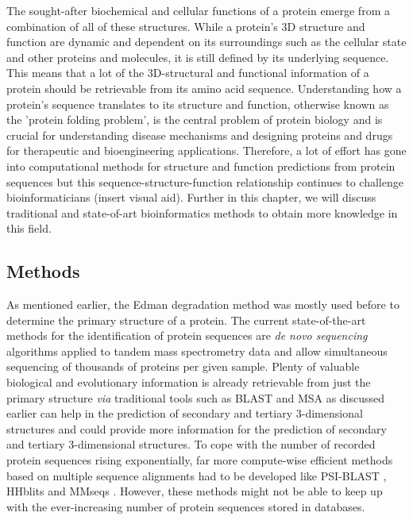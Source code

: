 The sought-after biochemical and cellular functions of a protein emerge from a combination of all of these structures. While a protein's 3D structure and function are dynamic and dependent on its surroundings such as the cellular state and other proteins and molecules, it is still defined by its underlying sequence. This means that a lot of the 3D-structural and functional information of a protein should be retrievable from its amino acid sequence\cite{structure}. Understanding how a protein's sequence translates to its structure and function, otherwise known as the 'protein folding problem', is the central problem of protein biology and is crucial for understanding disease mechanisms and designing proteins and drugs for therapeutic and bioengineering applications. Therefore, a lot of effort has gone into computational methods for structure and function predictions from protein sequences but this sequence-structure-function relationship continues to challenge bioinformaticians (insert visual aid). Further in this chapter, we will discuss traditional and state-of-art bioinformatics methods to obtain more knowledge in this field.

\subsection{Methods}
As mentioned earlier, the Edman degradation method was mostly used before to determine the primary structure of a protein. The current state-of-the-art methods for the identification of protein sequences are \textit{de novo sequencing} algorithms applied to tandem mass spectrometry data\cite{protseq} and allow simultaneous sequencing of thousands of proteins per given sample. Plenty of valuable biological and evolutionary information is already retrievable from just the primary structure \textit{via} traditional tools such as BLAST and MSA as discussed earlier can help in the prediction of secondary and tertiary 3-dimensional structures and could provide more information for the prediction of secondary and tertiary 3-dimensional structures. To cope with the number of recorded protein sequences rising exponentially, far more compute-wise efficient methods based on multiple sequence alignments had to be developed like PSI-BLAST \cite{psiblast}, HHblits \cite{hhblits3} and MMseqs \cite{mmseqs2}. However, these methods might not be able to keep up with the ever-increasing number of protein sequences stored in databases.

